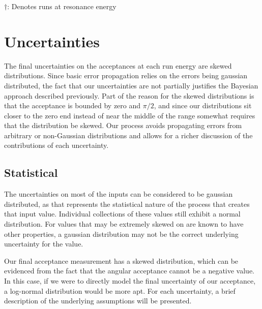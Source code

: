 \begin{table}
\begin{center}
        \vspace{0.5em}
        {\fontsize{10}{12}\selectfont$\dagger$: Denotes runs at
        resonance energy}
    \end{center}
\end{table}


\section{Uncertainties}
\label{sec:uncertainties}

The final uncertainties on the acceptances at each run energy are skewed
distributions. Since basic error propagation relies on the errors being
gaussian distributed, the fact that our uncertainties are not partially
justifies the Bayesian approach described previously. Part of the reason
for the skewed distributions is that the acceptance is bounded by zero
and $\pi/2$, and since our distributions sit closer to the zero end
instead of near the middle of the range somewhat requires that the
distribution be skewed. Our process avoids propagating errors from
arbitrary or non-Gaussian distributions and allows for a richer
discussion of the contributions of each uncertainty.

\subsection{Statistical}

The uncertainties on most of the inputs can be considered to be gaussian
distributed, as that represents the statistical nature of the process
that creates that input value. Individual collections of these values
still exhibit a normal distribution. For values that may be extremely
skewed on are known to have other properties, a gaussian distribution
may not be the correct underlying uncertainty for the value.

Our final acceptance measurement has a skewed distribution, which can be
evidenced from the fact that the angular acceptance cannot be a negative
value. In this case, if we were to directly model the final uncertainty
of our acceptance, a log-normal distribution would be more apt. For each
uncertainty, a brief description of the underlying assumptions will be
presented.

